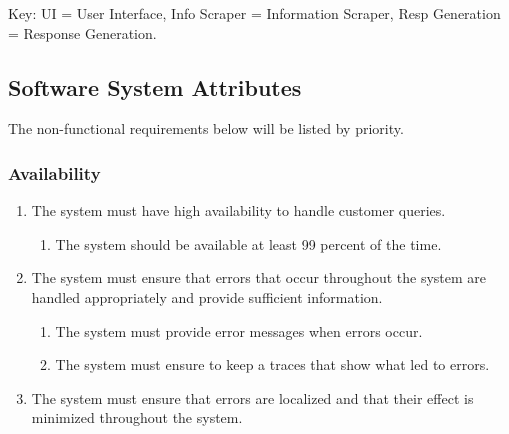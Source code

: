 \documentclass[11pt]{article}
\begin{document}
Key: UI = User Interface, Info Scraper = Information Scraper, Resp Generation =  Response Generation.

\subsection{Software System Attributes}%

The non-functional requirements below will be listed by priority.

\subsubsection{Availability}
\begin{enumerate}[label=R1.\arabic*.]
	\item The system must have high availability to handle customer queries.
	\begin{enumerate}[label*=\arabic*.]
		\item The system should be available at least 99 percent of the time.
	\end{enumerate}
	\item The system must ensure that errors that occur throughout the system are handled appropriately and provide sufficient
information.
	\begin{enumerate}[label*=\arabic*.]
		\item The system must provide error messages when errors occur.
		\item The system must ensure to keep a traces that show what led to errors.
	\end{enumerate}
	\item The system must ensure that errors are localized and that their effect is minimized throughout the system.
\end{enumerate}

\end{document}
